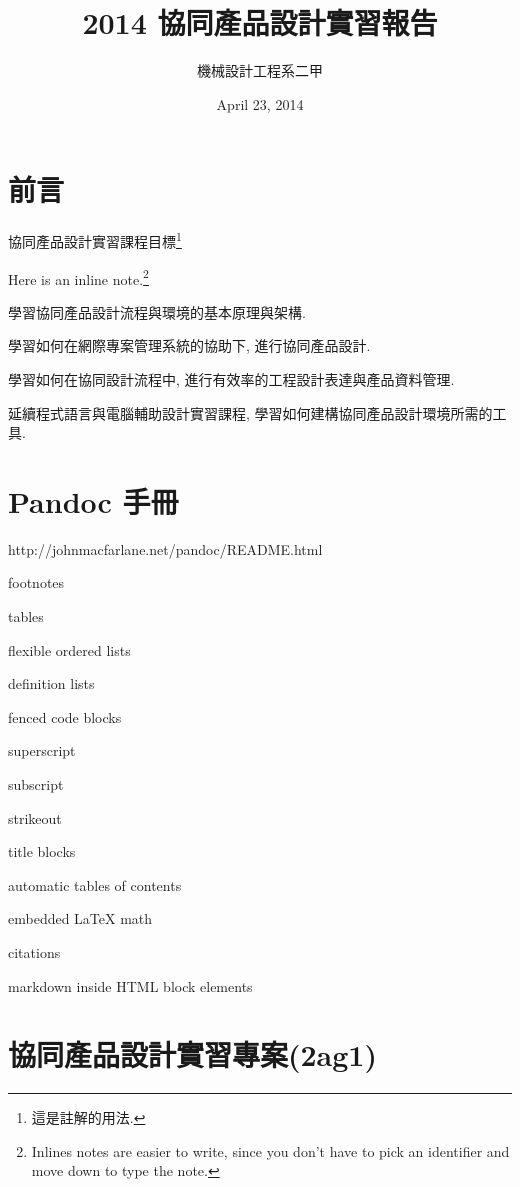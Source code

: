 \documentclass[]{article}
\title{2014 協同產品設計實習報告}
\author{機械設計工程系二甲}
\date{April 23, 2014}
\begin{document}
\maketitle

{
\hypersetup{linkcolor=black}
\setcounter{tocdepth}{3}
\tableofcontents
}
\section{前言}\label{ux524dux8a00}

協同產品設計實習課程目標\footnote{這是註解的用法.}

Here is an inline note.\footnote{Inlines notes are easier to write,
  since you don't have to pick an identifier and move down to type the
  note.}

學習協同產品設計流程與環境的基本原理與架構.

學習如何在網際專案管理系統的協助下, 進行協同產品設計.

學習如何在協同設計流程中, 進行有效率的工程設計表達與產品資料管理.

延續程式語言與電腦輔助設計實習課程,
學習如何建構協同產品設計環境所需的工具.

\section{Pandoc 手冊}\label{pandoc-ux624bux518a}

http://johnmacfarlane.net/pandoc/README.html

footnotes

tables

flexible ordered lists

definition lists

fenced code blocks

superscript

subscript

strikeout

title blocks

automatic tables of contents

embedded LaTeX math

citations

markdown inside HTML block elements

\section{協同產品設計實習專案(2ag1)}\label{ux5354ux540cux7522ux54c1ux8a2dux8a08ux5be6ux7fd2ux5c08ux68482ag1}
\end{document}
